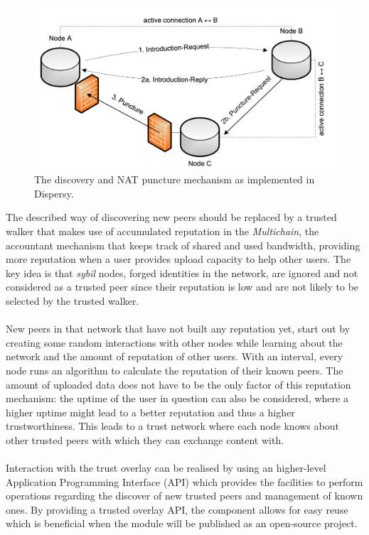 \begin{figure}[h!]
	\centering
	\includegraphics[width=0.7\columnwidth]{images/architecture/dispersy_discover}
	\caption{The discovery and NAT puncture mechanism as implemented in Dispersy.}
	\label{fig:dispersy-discover}
\end{figure}

The described way of discovering new peers should be replaced by a trusted walker that makes use of accumulated reputation in the \emph{Multichain}, the accountant mechanism that keeps track of shared and used bandwidth, providing more reputation when a user provides upload capacity to help other users. The key idea is that \emph{sybil} nodes, forged identities in the network, are ignored and not considered as a trusted peer since their reputation is low and are not likely to be selected by the trusted walker.\\\\
New peers in that network that have not built any reputation yet, start out by creating some random interactions with other nodes while learning about the network and the amount of reputation of other users. With an interval, every node runs an algorithm to calculate the reputation of their known peers. The amount of uploaded data does not have to be the only factor of this reputation mechanism: the uptime of the user in question can also be considered, where a higher uptime might lead to a better reputation and thus a higher trustworthiness. This leads to a trust network where each node knows about other trusted peers with which they can exchange content with.\\\\
Interaction with the trust overlay can be realised by using an higher-level Application Programming Interface (API) which provides the facilities to perform operations regarding the discover of new trusted peers and management of known ones. By providing a trusted overlay API, the component allows for easy reuse which is beneficial when the module will be published as an open-source project.


